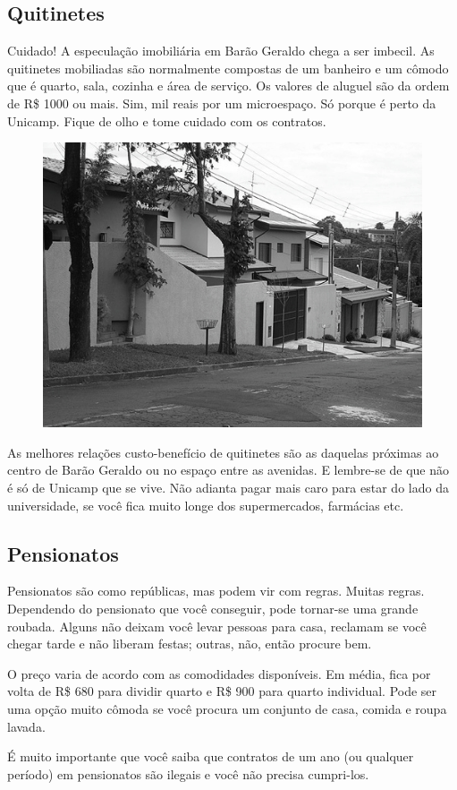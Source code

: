 \subsection{Quitinetes}

Cuidado! A especulação imobiliária em Barão Geraldo chega a ser imbecil. As
quitinetes mobiliadas são normalmente compostas de um banheiro e um cômodo que é
quarto, sala, cozinha e área de serviço. Os valores de aluguel são da ordem de
R\$ 1000 ou mais. Sim, mil reais por um microespaço. Só porque é perto da
Unicamp. Fique de olho e tome cuidado com os contratos.

\begin{figure}[h!]
    \centering
    \includegraphics[width=.45\textwidth]{img/barao/quitinete.jpg}
\end{figure}

As melhores relações custo-benefício de quitinetes são as daquelas próximas ao
centro de Barão Geraldo ou no espaço entre as avenidas. E lembre-se de que não é
só de Unicamp que se vive. Não adianta pagar mais caro para estar do lado da
universidade, se você fica muito longe dos supermercados, farmácias etc.

\subsection{Pensionatos}

Pensionatos são como repúblicas, mas podem vir com regras. Muitas
regras. Dependendo do pensionato que você conseguir, pode tornar-se
uma grande roubada. Alguns não deixam você levar pessoas para casa,
reclamam se você chegar tarde e não liberam festas; outras, não, então
procure bem.

O preço varia de acordo com as comodidades disponíveis. Em média, fica
por volta de R\$ 680 para dividir quarto e R\$ 900 para quarto
individual. Pode ser uma opção muito cômoda se você procura um
conjunto de casa, comida e roupa lavada.

É muito importante que você saiba que contratos de um ano (ou qualquer período)
em pensionatos são ilegais e você não precisa cumpri-los.

